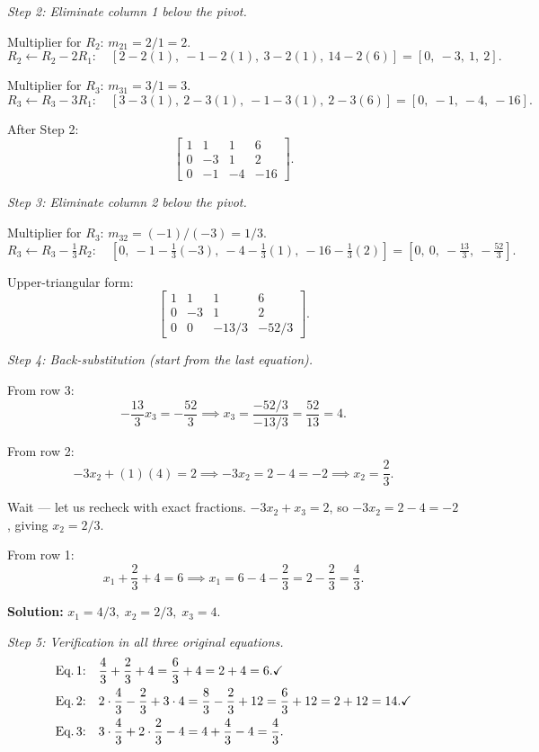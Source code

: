 \documentclass[12pt,a4paper]{article}
\begin{document}
\textit{Step 2: Eliminate column 1 below the pivot.}

Multiplier for $R_2$: $m_{21} = 2/1 = 2$.
\[
R_2 \leftarrow R_2 - 2R_1: \quad
[2-2(1),\ -1-2(1),\ 3-2(1),\ 14-2(6)]
= [0,\ -3,\ 1,\ 2].
\]

Multiplier for $R_3$: $m_{31} = 3/1 = 3$.
\[
R_3 \leftarrow R_3 - 3R_1: \quad
[3-3(1),\ 2-3(1),\ -1-3(1),\ 2-3(6)]
= [0,\ -1,\ -4,\ -16].
\]

After Step 2:
\[
\left[\begin{array}{ccc|c}
1 & 1 & 1 & 6 \\
0 & -3 & 1 & 2 \\
0 & -1 & -4 & -16
\end{array}\right].
\]

\textit{Step 3: Eliminate column 2 below the pivot.}

Multiplier for $R_3$: $m_{32} = (-1)/(-3) = 1/3$.
\[
R_3 \leftarrow R_3 - \tfrac{1}{3}R_2: \quad
\left[0,\ -1 - \tfrac{1}{3}(-3),\ -4 - \tfrac{1}{3}(1),\ -16 - \tfrac{1}{3}(2)\right]
= \left[0,\ 0,\ -\tfrac{13}{3},\ -\tfrac{52}{3}\right].
\]

Upper-triangular form:
\[
\left[\begin{array}{ccc|c}
1 & 1 & 1 & 6 \\
0 & -3 & 1 & 2 \\
0 & 0 & -13/3 & -52/3
\end{array}\right].
\]

\textit{Step 4: Back-substitution (start from the last equation).}

From row 3:
\[
-\frac{13}{3} x_3 = -\frac{52}{3} \implies x_3 = \frac{-52/3}{-13/3} = \frac{52}{13} = 4.
\]

From row 2:
\[
-3x_2 + (1)(4) = 2 \implies -3x_2 = 2 - 4 = -2 \implies x_2 = \frac{2}{3}.
\]

Wait --- let us recheck with exact fractions.
$-3x_2 + x_3 = 2$, so $-3x_2 = 2 - 4 = -2$, giving $x_2 = 2/3$.

From row 1:
\[
x_1 + \frac{2}{3} + 4 = 6 \implies x_1 = 6 - 4 - \frac{2}{3} = 2 - \frac{2}{3} = \frac{4}{3}.
\]

\textbf{Solution:} $x_1 = 4/3,\; x_2 = 2/3,\; x_3 = 4$.

\textit{Step 5: Verification in all three original equations.}
\begin{align*}
\text{Eq.\,1:}\quad & \frac{4}{3} + \frac{2}{3} + 4 = \frac{6}{3} + 4 = 2 + 4 = 6. \checkmark \\
\text{Eq.\,2:}\quad & 2\cdot\frac{4}{3} - \frac{2}{3} + 3\cdot 4
  = \frac{8}{3} - \frac{2}{3} + 12 = \frac{6}{3} + 12 = 2 + 12 = 14. \checkmark \\
\text{Eq.\,3:}\quad & 3\cdot\frac{4}{3} + 2\cdot\frac{2}{3} - 4
  = 4 + \frac{4}{3} - 4 = \frac{4}{3}. \quad
\end{align*}
\end{document}
